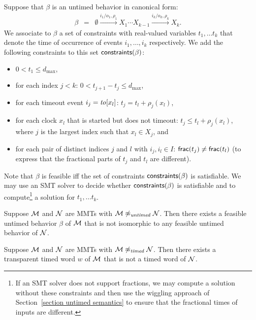 Suppose that $\beta$ is an untimed behavior in canonical form:
\begin{eqnarray*}
\beta & = & \emptyset \xrightarrow{i_1/o_1, \rho_1} X_1  \cdots X_{k-1} \xrightarrow{i_k/o_k, \rho_k} X_k.
\end{eqnarray*}
We associate to $\beta$ a set of constraints with real-valued variables $t_1 ,\ldots t_k$ that denote the time of
occurrence of events $i_1 ,\ldots, i_k$ respectively. We add the following constraints to this set $\mathsf{constraints}({\beta})$:
\begin{itemize}
\item
$0 < t_1 \leq d_{\max}$,
\item
for each index $j < k$:  $0 <  t_{j+1} - t_j \leq d_{\max}$,
\item
for each timeout event $i_j = \mathit{to}[x_l]$: $t_j = t_l + \rho_j(x_l)$,
\item
for each clock $x_l$ that is started but does not timeout: $t_j \leq t_l + \rho_j(x_l)$,
where $j$ is the largest index such that $x_l \in X_j$, and
\item
for each pair of distinct indices $j$ and $l$ with $i_j, i_l \in I$: $\mathsf{frac}({t_j}) \neq \mathsf{frac}({t_l})$ 
(to express that the fractional parts of $t_j$ and $t_l$ are different).
\end{itemize}
Note that $\beta$ is feasible iff the set of constraints $\mathsf{constraints}({\beta})$ is satisfiable.
We may use an SMT solver to decide whether $\mathsf{constraints}({\beta})$ is satisfiable and to compute\footnote{If an SMT solver
does not support fractions, we may compute a solution without these constraints and then use the wiggling approach
of Section~\ref{section untimed semantics} to ensure that the fractional times of inputs are different.} a solution for
$t_1 ,\ldots t_k$.


\begin{lemma}
\label{not untimed}
Suppose ${\mathcal M}$ and ${\mathcal N}$ are MMTs with ${\mathcal M} \not\approx_{\mathit{untimed}} {\mathcal N}$.
Then there exists a feasible untimed behavior $\beta$ of ${\mathcal M}$ that is not isomorphic to any feasible untimed
behavior of ${\mathcal N}$.
\end{lemma}

\begin{lemma}
\label{not timed}
Suppose ${\mathcal M}$ and ${\mathcal N}$ are MMTs with ${\mathcal M} \not\approx_{\mathit{timed}} {\mathcal N}$.
Then there exists a transparent timed word $w$ of ${\mathcal M}$ that is not a timed word of ${\mathcal N}$.
\end{lemma}

